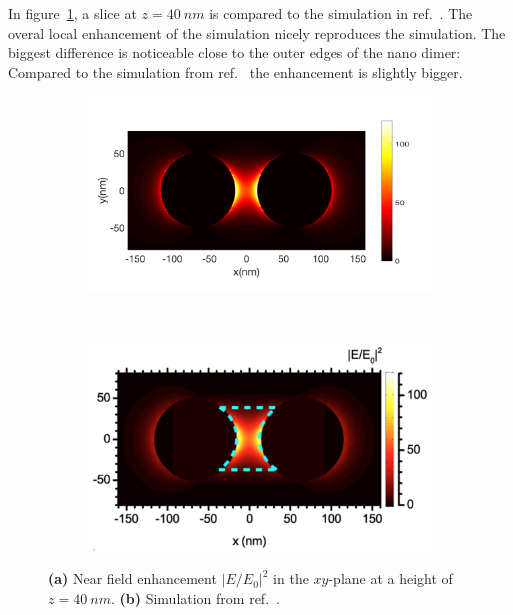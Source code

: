 In figure~\ref{fig:slice-comparision}, a slice at $z=\SI{40}{nm}$ is compared to the simulation in ref.~\cite{heeg}. The overal local enhancement of the simulation nicely reproduces the simulation. The biggest difference is noticeable close to the outer edges of the nano dimer: Compared to the simulation from ref.~\cite{heeg} the enhancement is slightly bigger.

\begin{figure}[!h]
  \centering
  \begin{subfigure}[t]{0.50\textwidth}
    \caption{}
    \includegraphics[width=\textwidth]{./images/40nm.png}
  \end{subfigure}
  ~
  \begin{subfigure}[t]{0.40\textwidth}
    \caption{}
    \includegraphics[width=\textwidth]{./images/local-enhancement-heeg.png}
  \end{subfigure}
  \caption{\textbf{(a)} Near field enhancement $|E/E_0|^2$ in the $xy$-plane at a height of $z=\SI{40}{nm}$. \textbf{(b)} Simulation from ref.~\cite{heeg}.}
  \label{fig:slice-comparision}
\end{figure}


